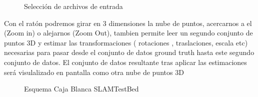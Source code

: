 \begin{figure}[H]
\begin{center}
\hspace{0.5cm}
\end{center}
\caption{Selección de archivos de entrada }
\end{figure}

Con el ratón podremos girar en 3 dimensiones la nube de puntos, acercarnos a el (Zoom in) o alejarnos (Zoom Out),
tambien permite leer un segundo conjunto de puntos 3D y estimar las transformaciones ( rotaciones , traslaciones, escala etc)  necesarias para pasar desde el conjunto de datos ground truth hasta este segundo conjunto de datos. El conjunto de datos resultante tras aplicar las estimaciones será visulalizado en pantalla como otra nube de puntos 3D

\begin{figure}[H]
\begin{center}
\hspace{0.5cm}
\end{center}
\caption{Esquema Caja Blanca SLAMTestBed }
\end{figure}


